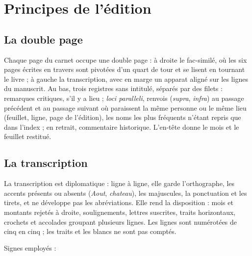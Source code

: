 \section{Principes de l'édition}

\subsection{La double page}

Chaque page du carnet occupe une double page : à droite le fac-similé, où les six pages écrites en travers sont pivotées d'un quart de tour et se lisent en tournant le livre ; à gauche la transcription, avec en marge un apparat aligné sur les lignes du manuscrit. Au bas, trois registres sans intitulé, séparés par des filets : remarques critiques, s'il y a lieu ; \textit{loci paralleli}, renvois (\textit{supra}, \textit{infra}) au passage précédent et au passage suivant où paraissent la même personne ou le même lieu (feuillet, ligne, page de l'édition), les noms les plus fréquents n'étant repris que dans l'index ; en retrait, commentaire historique. L'en-tête donne le mois et le feuillet restitué.

\subsection{La transcription}

La transcription est diplomatique : ligne à ligne, elle garde l'orthographe, les accents présents ou absents (\textit{Aout}, \textit{chateau}), les majuscules, la ponctuation et les tirets, et ne développe pas les abréviations. Elle rend la disposition : mois et montants rejetés à droite, soulignements, lettres suscrites, traits horizontaux, crochets et accolades groupant plusieurs lignes. Les lignes sont numérotées de cinq en cinq ; les traits et les blancs ne sont pas comptés.

\noindent Signes employés :

